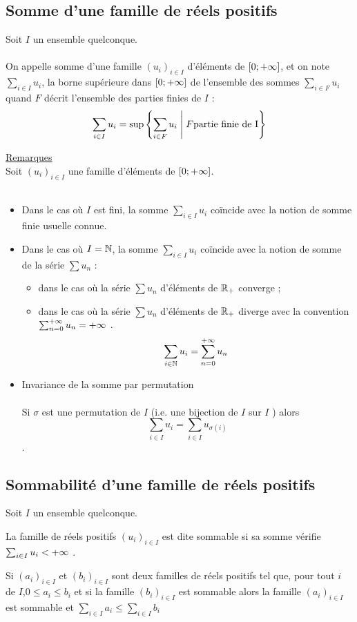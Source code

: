 \subsection{Somme d’une famille de réels positifs}
\begin{defprop}
    Soit \(I\) un ensemble quelconque.\\~\\
    On appelle somme d’une famille \((u_i)_{i\in I}\) d’éléments de \(\left[0;+\infty\right]\), et on note \(\sum_{i\in I} u_i\), la borne supérieure dans \(\left[0;+\infty\right]\) de l’ensemble des sommes \(\sum_{i\in F}u_i\) quand \(F\) décrit l’ensemble des parties finies de \(I\) :
    \[\sum_{i\in I}u_i = \sup \left\lbrace\sum_{i\in F}u_i \;\middle|\; F \text{partie finie de I}\right\rbrace\]

    \underline{Remarques}\\
    Soit \((u_i)_{i\in I}\) une famille d’éléments de \(\left[0;+\infty\right]\).\\~\\
    \begin{itemize}
        \item Dans le cas où \(I\) est fini, la somme \(\sum_{i\in I}u_i\) coïncide avec la notion de somme finie usuelle connue.
        \item Dans le cas où \(I = \mathbb{N}\), la somme \(\sum_{i\in I}u_i\) coïncide avec la notion de somme de la série \(\sum u_n\) :
        \begin{itemize}
            \item dans le cas où la série \(\sum u_n\) d’éléments de \(\mathbb{R}_+\) converge ;
            \item dans le cas où la série \(\sum u_n\) d’éléments de \(\mathbb{R}_+\) diverge avec la convention \(\sum^{+\infty}_{n=0}u_n = +\infty\) .
            \[\sum_{i\in \mathbb{N}}u_i =\sum^{+\infty}_{n=0}u_n\]
        \end{itemize}
        \item Invariance de la somme par permutation\\~\\
            Si \(\sigma\) est une permutation de \(I\) (i.e. une bijection de \(I\) sur \(I\) ) alors
            \[\sum_{i\in I}u_i = \sum_{i\in I}u_{\sigma(i)}\].
    \end{itemize}
\end{defprop}

\subsection{Sommabilité d’une famille de réels positifs}
    Soit \(I\) un ensemble quelconque.
\begin{defi}
    La famille de réels positifs \((u_i)_{i\in I}\) est dite sommable si sa somme vérifie \(\sum_{i\in I}u_i < +\infty\) .
\end{defi}
\begin{prop}
    Si \((a_i)_{i\in I}\) et \((b_i)_{i\in I}\) sont deux familles de réels positifs tel que, pour tout \(i\) de \(I\),\( 0 \leq  a_i \leq  b_i\) et si la famille \((b_i)_{i\in I}\) est sommable alors la famille \((a_i)_{i\in I}\) est sommable et \(\sum_{i\in I}a_i \leq  \sum_{i\in I}b_i\)
\end{prop}
